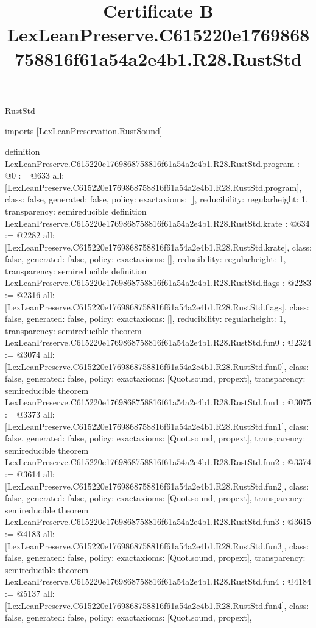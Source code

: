 \begin{lexlean}{RustStd}
\title{Certificate B LexLeanPreserve.C615220e1769868758816f61a54a2e4b1.R28.RustStd}
\begin{coremodule}
imports [LexLeanPreservation.RustSound]

definition LexLeanPreserve.C615220e1769868758816f61a54a2e4b1.R28.RustStd.program : @0 := @633 {
  all: [LexLeanPreserve.C615220e1769868758816f61a54a2e4b1.R28.RustStd.program],
  class: false,
  generated: false,
  policy: exact{axioms: []},
  reducibility: regular{height: 1},
  transparency: semireducible
}
definition LexLeanPreserve.C615220e1769868758816f61a54a2e4b1.R28.RustStd.krate : @634 := @2282 {
  all: [LexLeanPreserve.C615220e1769868758816f61a54a2e4b1.R28.RustStd.krate],
  class: false,
  generated: false,
  policy: exact{axioms: []},
  reducibility: regular{height: 1},
  transparency: semireducible
}
definition LexLeanPreserve.C615220e1769868758816f61a54a2e4b1.R28.RustStd.flags : @2283 := @2316 {
  all: [LexLeanPreserve.C615220e1769868758816f61a54a2e4b1.R28.RustStd.flags],
  class: false,
  generated: false,
  policy: exact{axioms: []},
  reducibility: regular{height: 1},
  transparency: semireducible
}
theorem LexLeanPreserve.C615220e1769868758816f61a54a2e4b1.R28.RustStd.fun0 : @2324 := @3074 {
  all: [LexLeanPreserve.C615220e1769868758816f61a54a2e4b1.R28.RustStd.fun0],
  class: false,
  generated: false,
  policy: exact{axioms: [Quot.sound, propext]},
  transparency: semireducible
}
theorem LexLeanPreserve.C615220e1769868758816f61a54a2e4b1.R28.RustStd.fun1 : @3075 := @3373 {
  all: [LexLeanPreserve.C615220e1769868758816f61a54a2e4b1.R28.RustStd.fun1],
  class: false,
  generated: false,
  policy: exact{axioms: [Quot.sound, propext]},
  transparency: semireducible
}
theorem LexLeanPreserve.C615220e1769868758816f61a54a2e4b1.R28.RustStd.fun2 : @3374 := @3614 {
  all: [LexLeanPreserve.C615220e1769868758816f61a54a2e4b1.R28.RustStd.fun2],
  class: false,
  generated: false,
  policy: exact{axioms: [Quot.sound, propext]},
  transparency: semireducible
}
theorem LexLeanPreserve.C615220e1769868758816f61a54a2e4b1.R28.RustStd.fun3 : @3615 := @4183 {
  all: [LexLeanPreserve.C615220e1769868758816f61a54a2e4b1.R28.RustStd.fun3],
  class: false,
  generated: false,
  policy: exact{axioms: [Quot.sound, propext]},
  transparency: semireducible
}
theorem LexLeanPreserve.C615220e1769868758816f61a54a2e4b1.R28.RustStd.fun4 : @4184 := @5137 {
  all: [LexLeanPreserve.C615220e1769868758816f61a54a2e4b1.R28.RustStd.fun4],
  class: false,
  generated: false,
  policy: exact{axioms: [Quot.sound, propext]},
}
\end{coremodule}
\end{lexlean}

